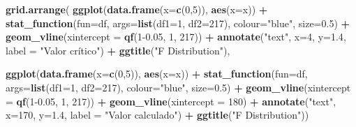 \documentclass[
]{book}
\newenvironment{Shaded}{\begin{snugshade}}{\end{snugshade}}
\newcommand{\DataTypeTok}[1]{\textcolor[rgb]{0.13,0.29,0.53}{#1}}
\newcommand{\DecValTok}[1]{\textcolor[rgb]{0.00,0.00,0.81}{#1}}
\newcommand{\FloatTok}[1]{\textcolor[rgb]{0.00,0.00,0.81}{#1}}
\newcommand{\KeywordTok}[1]{\textcolor[rgb]{0.13,0.29,0.53}{\textbf{#1}}}
\newcommand{\NormalTok}[1]{#1}
\newcommand{\OperatorTok}[1]{\textcolor[rgb]{0.81,0.36,0.00}{\textbf{#1}}}
\newcommand{\StringTok}[1]{\textcolor[rgb]{0.31,0.60,0.02}{#1}}
\begin{document}
\begin{Shaded}
\begin{Highlighting}[]
\KeywordTok{grid.arrange}\NormalTok{(}
  \KeywordTok{ggplot}\NormalTok{(}\KeywordTok{data.frame}\NormalTok{(}\DataTypeTok{x=}\KeywordTok{c}\NormalTok{(}\DecValTok{0}\NormalTok{,}\DecValTok{5}\NormalTok{)), }\KeywordTok{aes}\NormalTok{(}\DataTypeTok{x=}\NormalTok{x)) }\OperatorTok{+}
\StringTok{     }\KeywordTok{stat_function}\NormalTok{(}\DataTypeTok{fun=}\NormalTok{df, }\DataTypeTok{args=}\KeywordTok{list}\NormalTok{(}\DataTypeTok{df1=}\DecValTok{1}\NormalTok{, }\DataTypeTok{df2=}\DecValTok{217}\NormalTok{), }\DataTypeTok{colour=}\StringTok{"blue"}\NormalTok{, }\DataTypeTok{size=}\FloatTok{0.5}\NormalTok{) }\OperatorTok{+}
\StringTok{     }\KeywordTok{geom_vline}\NormalTok{(}\DataTypeTok{xintercept =} \KeywordTok{qf}\NormalTok{(}\DecValTok{1}\FloatTok{-0.05}\NormalTok{, }\DecValTok{1}\NormalTok{, }\DecValTok{217}\NormalTok{)) }\OperatorTok{+}
\StringTok{      }\KeywordTok{annotate}\NormalTok{(}\StringTok{"text"}\NormalTok{, }\DataTypeTok{x=}\DecValTok{4}\NormalTok{, }\DataTypeTok{y=}\FloatTok{1.4}\NormalTok{, }\DataTypeTok{label =} \StringTok{"Valor crítico"}\NormalTok{) }\OperatorTok{+}
\StringTok{     }\KeywordTok{ggtitle}\NormalTok{(}\StringTok{"F Distribution"}\NormalTok{),}
  
  \KeywordTok{ggplot}\NormalTok{(}\KeywordTok{data.frame}\NormalTok{(}\DataTypeTok{x=}\KeywordTok{c}\NormalTok{(}\DecValTok{0}\NormalTok{,}\DecValTok{5}\NormalTok{)), }\KeywordTok{aes}\NormalTok{(}\DataTypeTok{x=}\NormalTok{x)) }\OperatorTok{+}
\StringTok{     }\KeywordTok{stat_function}\NormalTok{(}\DataTypeTok{fun=}\NormalTok{df, }\DataTypeTok{args=}\KeywordTok{list}\NormalTok{(}\DataTypeTok{df1=}\DecValTok{1}\NormalTok{, }\DataTypeTok{df2=}\DecValTok{217}\NormalTok{), }\DataTypeTok{colour=}\StringTok{"blue"}\NormalTok{, }\DataTypeTok{size=}\FloatTok{0.5}\NormalTok{) }\OperatorTok{+}
\StringTok{     }\KeywordTok{geom_vline}\NormalTok{(}\DataTypeTok{xintercept =} \KeywordTok{qf}\NormalTok{(}\DecValTok{1}\FloatTok{-0.05}\NormalTok{, }\DecValTok{1}\NormalTok{, }\DecValTok{217}\NormalTok{)) }\OperatorTok{+}
\StringTok{     }\KeywordTok{geom_vline}\NormalTok{(}\DataTypeTok{xintercept =} \DecValTok{180}\NormalTok{) }\OperatorTok{+}
\StringTok{     }\KeywordTok{annotate}\NormalTok{(}\StringTok{"text"}\NormalTok{, }\DataTypeTok{x=}\DecValTok{170}\NormalTok{, }\DataTypeTok{y=}\FloatTok{1.4}\NormalTok{, }\DataTypeTok{label =} \StringTok{"Valor calculado"}\NormalTok{) }\OperatorTok{+}
\StringTok{     }\KeywordTok{ggtitle}\NormalTok{(}\StringTok{"F Distribution"}\NormalTok{))}
\end{Highlighting}
\end{Shaded}
\end{document}
